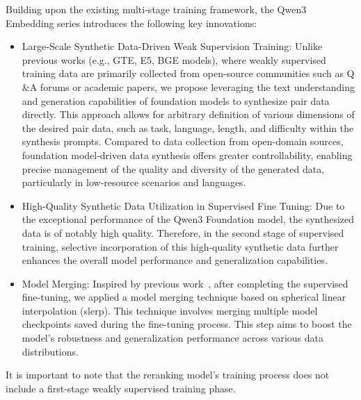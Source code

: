 Building upon the existing multi-stage training framework, the Qwen3 Embedding series introduces the following key innovations:
\begin{itemize}
    \item Large-Scale Synthetic Data-Driven Weak Supervision Training: Unlike previous works (e.g., GTE, E5, BGE models), where weakly supervised training data are primarily collected from open-source communities such as Q$\&$A forums or academic papers, we propose leveraging the text understanding and generation capabilities of foundation models to synthesize pair data directly. This approach allows for arbitrary definition of various dimensions of the desired pair data, such as task, language, length, and difficulty within the synthesis prompts. Compared to data collection from open-domain sources, foundation model-driven data synthesis offers greater controllability, enabling precise management of the quality and diversity of the generated data, particularly in low-resource scenarios and languages.
    \item High-Quality Synthetic Data Utilization in Supervised Fine Tuning: Due to the exceptional performance of the Qwen3 Foundation model, the synthesized data is of notably high quality. Therefore, in the second stage of supervised training, selective incorporation of this high-quality synthetic data further enhances the overall model performance and generalization capabilities.
    \item Model Merging: Inspired by previous work~\citep{li2024improving}, after completing the supervised fine-tuning, we applied a model merging technique based on spherical linear interpolation (slerp). This technique involves merging multiple model checkpoints saved during the fine-tuning process. This step aims to boost the model’s robustness and generalization performance across various data distributions.
\end{itemize}
It is important to note that the reranking model's training process does not include a first-stage weakly supervised training phase.


